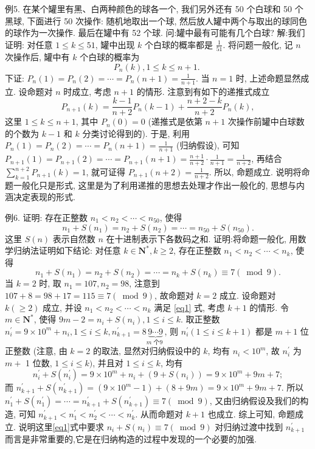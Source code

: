 例5. 在某个罐里有黑、白两种颜色的球各一个, 我们另外还有 50 个白球和 50 个黑球, 下面进行 50 次操作: 随机地取出一个球, 然后放人罐中两个与取出的球同色的球作为一次操作.
最后在罐中有 52 个球.
问:罐中最有可能有几个白球?
解:我们证明: 对任意 $1 \leqslant k \leqslant 51$, 罐中出现 $k$ 个白球的概率都是 $\frac{1}{51}$.
将问题一般化, 记 $n$ 次操作后, 罐中有 $k$ 个白球的概率为
$$
P_n(k), 1 \leqslant k \leqslant n+1 \text {. }
$$
下证: $P_n(1)=P_n(2)=\cdots=P_n(n+1)=\frac{1}{n+1}$.
当 $n=1$ 时, 上述命题显然成立.
设命题对 $n$ 时成立, 考虑 $n+1$ 的情形.
注意到有如下的递推式成立
$$
P_{n+1}(k)=\frac{k-1}{n+2} P_n(k-1)+\frac{n+2-k}{n+2} P_n(k),
$$
这里 $1 \leqslant k \leqslant n+1$, 其中 $P_n(0)=0$ (递推式是依第 $n+1$ 次操作前罐中白球数的个数为 $k-1$ 和 $k$ 分类讨论得到的).
于是, 利用 $P_n(1)=P_n(2)=\cdots=P_n(n+1)=\frac{1}{n+1}$ (归纳假设), 可知
$P_{n+1}(1)=P_{n+1}(2)=\cdots=P_{n+1}(n+1)=\frac{n+1}{n+2} \cdot \frac{1}{n+1}=\frac{1}{n+2}$, 再结合 $\sum_{k=1}^{n+2} P_{n+1}(k)=1$, 就可证得 $P_{n+1}(n+2)=\frac{1}{n+2}$.
所以, 命题成立.
说明将命题一般化只是形式, 这里是为了利用递推的思想去处理才作出一般化的, 思想与内涵决定表现的形式.



例6. 证明: 存在正整数 $n_1<n_2<\cdots<n_{50}$, 使得
$$
n_1+S\left(n_1\right)=n_2+S\left(n_2\right)=\cdots=n_{50}+S\left(n_{50}\right) .
$$
这里 $S(n)$ 表示自然数 $n$ 在十进制表示下各数码之和.
证明:将命题一般化, 用数学归纳法证明如下结论:
对任意 $k \in \mathbf{N}^*, k \geqslant 2$, 存在正整数 $n_1<n_2<\cdots<n_k$, 使得
$$
n_1+S\left(n_1\right)=n_2+S\left(n_2\right)=\cdots=n_k+S\left(n_k\right) \equiv 7(\bmod 9) . \label{eq1}
$$
当 $k=2$ 时, 取 $n_1=107, n_2=98$, 注意到 $107+8=98+17=115 \equiv 7(\bmod 9)$, 故命题对 $k=2$ 成立.
设命题对 $k(\geqslant 2)$ 成立, 并设 $n_1<n_2<\cdots<n_k$ 满足 \ref{eq1} 式, 考虑 $k+1$ 的情形.
令 $m \in \mathbf{N}^*$, 使得 $9 m-2=n_i+S\left(n_i\right), 1 \leqslant i \leqslant k$. 取正整数 $n_i^{\prime}=9 \times 10^m+n_i, 1 \leqslant i \leqslant k, n_{k+1}^{\prime}=8 \underbrace{9 \cdots 9}_{m \text { 个9 }}$, 则 $n_i^{\prime}(1 \leqslant i \leqslant k+1)$ 都是 $m+1$ 位正整数 (注意, 由 $k=2$ 的取法, 显然对归纳假设中的 $k$, 均有 $n_i<10^m$, 故 $n_i^{\prime}$ 为 $m+$ 1 位数, $1 \leqslant i \leqslant k)$, 并且对 $1 \leqslant i \leqslant k$, 均有
$$
n_i^{\prime}+S\left(n_i^{\prime}\right)=9 \times 10^m+n_i+\left(9+S\left(n_i\right)\right)=9 \times 10^m+9 m+7 ;
$$
而 $n_{k+1}^{\prime}+S\left(n_{k+1}^{\prime}\right)=\left(9 \times 10^m-1\right)+(8+9 m)=9 \times 10^m+9 m+7$.
所以 $n_1^{\prime}+S\left(n_1^{\prime}\right)=\cdots=n_{k+1}^{\prime}+S\left(n_{k+1}^{\prime}\right) \equiv 7(\bmod 9)$, 又由归纳假设及我们的构造, 可知 $n_{k+1}^{\prime}<n_1^{\prime}<n_2^{\prime}<\cdots<n_k^{\prime}$. 从而命题对 $k+1$ 也成立.
综上可知, 命题成立.
说明这里\ref{eq1}式中要求 $n_i+S\left(n_i\right) \equiv 7(\bmod 9)$ 对归纳过渡中找到 $n_{k+1}^{\prime}$ 而言是非常重要的,它是在归纳构造的过程中发现的一个必要的加强.


